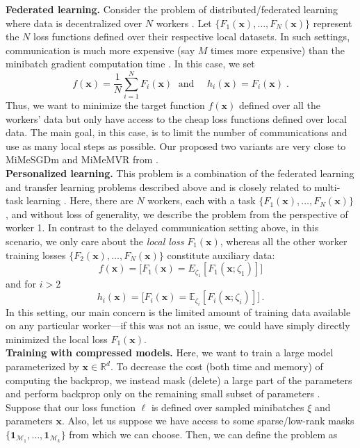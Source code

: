 \documentclass[10pt]{article} %
\theoremstyle{plain}
\theoremstyle{definition}
\theoremstyle{remark}
\def\1{\bm{1}}
\def\vg{{\bm{g}}}
\def\vx{{\bm{x}}}
\newcommand{\E}{\mathbb{E}}
\newcommand{\R}{\mathbb{R}}
\begin{document}
\textbf{Federated learning.} Consider the problem of distributed/federated learning where data is decentralized over $N$ workers \citep{mcmahan2017communication}. Let $\{F_1(\vx), \dots, F_N(\vx)\}$ represent the $N$ loss functions defined over their respective local datasets. In such settings, communication is much more expensive (say $M$ times more expensive) than the minibatch gradient computation time \citep{karimireddy2018adaptive}. In this case, we set\[
    f(\vx) = \frac{1}{N}\sum_{i=1}^N F_i(\vx) \;\text{ and } \quad h_i(\vx) = F_i(\vx)\;.
\]
Thus, we want to minimize the target function $f(\vx)$ defined over all the workers' data but only have access to the cheap loss functions defined over local data. The main goal, in this case, is to limit the number of communications and use as many local steps as possible. Our proposed two variants are very close to MiMeSGDm and MiMeMVR from \citep{MiMe}.\\
\textbf{Personalized learning.} This problem is a combination of the federated learning and transfer learning problems described above and is closely related to multi-task learning \citep{ruder2017overview}. Here, there are $N$ workers, each with a task $\{F_1(\vx), \dots, F_N(\vx)\}$, and without loss of generality, we describe the problem from the perspective of worker 1. In contrast to the delayed communication setting above, in this scenario, we only care about the \emph{local loss} $F_1(\vx)$, whereas all the other worker training losses $\{F_2(\vx), \dots, F_N(\vx)\}$ constitute auxiliary data:
 \[
     f(\vx) = \big[F_1(\vx) = E_{\zeta_1}[F_1(\vx; \zeta_1)]\big]\] and for $i>2$\[  h_i(\vx) = \big[F_i(\vx) = \E_{\zeta_i} [F_i(\vx; \zeta_i)]\big]\,.
\]
 In this setting, our main concern is the limited amount of training data available on any particular worker---if this was not an issue, we could have simply directly minimized the local loss $F_1(\vx)$.\\%
\textbf{Training with compressed models.} Here, we want to train a large model parameterized by $\vx \in \R^d$. To decrease the cost (both time and memory) of computing the backprop, we instead mask (delete) a large part of the parameters and perform backprop only on the remaining small subset of parameters \citep{sun2017meprop,yu2019universally}. Suppose that our loss function $\ell$ is defined over sampled minibatches $\xi$ and parameters $\vx$. Also, let us suppose we have access to some sparse/low-rank masks $\{\1_{\mathcal{M}_1}, \dots, \1_{\mathcal{M}_k}\}$ from which we can choose. Then, we can define the problem as 
\end{document}
